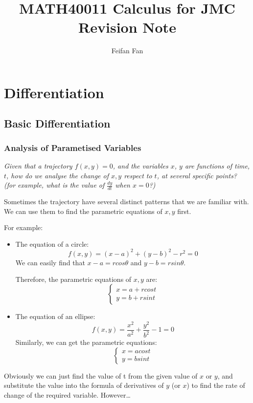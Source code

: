 \documentclass[12pt]{report}
\title{MATH40011 Calculus for JMC 
 \\ Revision Note}
\author{Feifan Fan}
\begin{document}
\maketitle
\tableofcontents

\chapter{Differentiation}

\section{Basic Differentiation}

\subsection{Analysis of Parametised Variables}

\emph{Given that a trajectory $f(x, y) = 0$, and the variables $x$, $y$ are 
functions of time, $t$, how do we analyse the change of $x, y$ respect to $t$, at several specific points?
(for example, what is the value of $\frac{dy}{dt}$ when $x = 0$?)}
\newline

\noindent Sometimes the trajectory have several distinct patterns that we are familiar with. 
We can use them to find the parametric equations of $x, y$ first. 

\noindent For example:
\begin{itemize}
    \item The equation of a circle:
    $$
    f(x, y) = (x - a)^2 + (y - b)^2  - r^2 = 0 
    $$
    We can easily find that $x - a = rcos\theta$ and $y - b = rsin\theta$. 
    
    Therefore, the parametric equations of $x, y$ are:
    $$
    \left\{
        \begin{array}{l}
            x = a + rcost\\
            y = b + rsint
        \end{array}
    \right.
    $$
    \item The equation of an ellipse:
    $$
    f(x, y) = \frac{x^2}{a^2} + \frac{y^2}{b^2} - 1 = 0
    $$
    Similarly, we can get the parametric equations:
    $$
    \left\{
        \begin{array}{l}
            x = acost\\
            y = bsint
        \end{array}
    \right.
    $$
\end{itemize}
Obviously we can just find the value of t from the given value of $x$ or $y$, 
and substitute the value into the formula of derivatives of $y$ (or $x$) to find the rate of change of the required variable. However\dots
\newline
\end{document}
